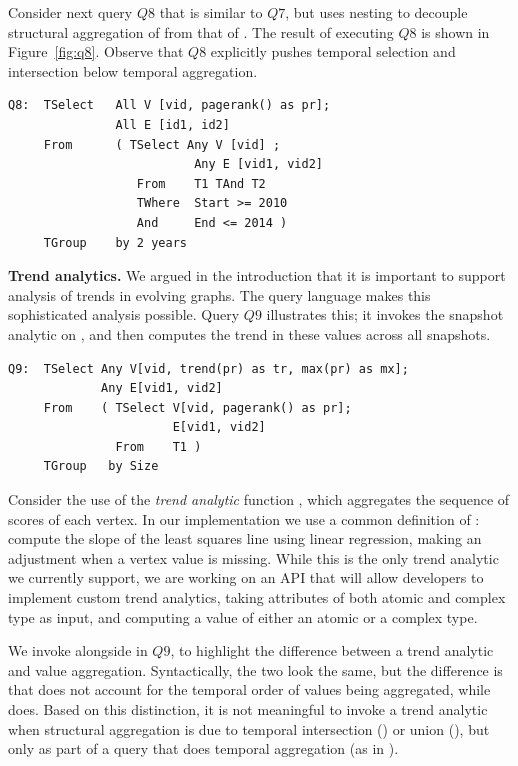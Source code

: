 Consider next query $Q8$ that is similar to $Q7$, but uses nesting to
decouple structural aggregation of  from that of
. The result of executing $Q8$ is shown in
Figure~\ref{fig:q8}.  Observe that $Q8$ explicitly pushes temporal
selection and intersection below temporal aggregation.

\begin{small}
\begin{verbatim}
Q8:  TSelect   All V [vid, pagerank() as pr];
               All E [id1, id2]
     From      ( TSelect Any V [vid] ; 
                          Any E [vid1, vid2]
                  From    T1 TAnd T2
                  TWhere  Start >= 2010 
                  And     End <= 2014 )
     TGroup    by 2 years
\end{verbatim}
\end{small}

{\bf Trend analytics.} We argued in the introduction that it is
important to support analysis of trends in evolving graphs.  The \ql
query language makes this sophisticated analysis possible.  Query $Q9$
illustrates this; it invokes the snapshot analytic 
on , and then computes the trend in these values across all
snapshots.

\begin{small}
\begin{verbatim}
Q9:  TSelect Any V[vid, trend(pr) as tr, max(pr) as mx];
             Any E[vid1, vid2]  
     From    ( TSelect V[vid, pagerank() as pr];   
                       E[vid1, vid2]
               From    T1 )
     TGroup   by Size
\end{verbatim}
\end{small}

Consider the use of the {\em trend analytic} function
, which aggregates the sequence of 
scores of each vertex.  In our implementation we use a common
definition of : compute the slope of the least squares
line using linear regression, making an adjustment when a vertex value
is missing.  While this is the only trend analytic we currently
support, we are working on an API that will allow developers to
implement custom trend analytics, taking attributes of both atomic and
complex type as input, and computing a value of either an atomic or a
complex type.

We invoke  alongside  in $Q9$, to
highlight the difference between a trend analytic and value
aggregation.  Syntactically, the two look the same, but the difference
is that  does not account for the temporal order of
values being aggregated, while  does.  Based on this
distinction, it is not meaningful to invoke a trend analytic when
structural aggregation is due to temporal intersection ()
or union (), but only as part of a query that does temporal
aggregation (as in ).

